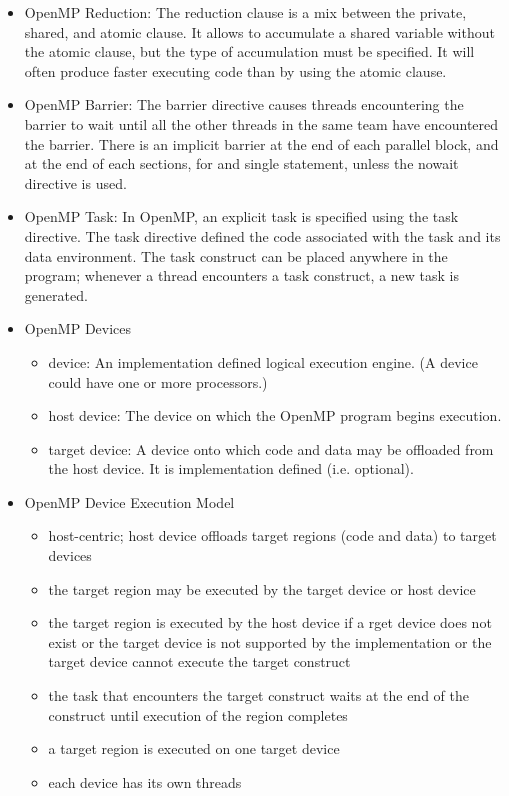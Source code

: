 \documentclass[paper=a4, fontsize=11pt]{scrartcl} %
\numberwithin{equation}{section} %
\numberwithin{figure}{section} %
\numberwithin{table}{section} %
\begin{document}
\begin{itemize}
  \item OpenMP Reduction: The reduction clause is a mix between the private, shared, and atomic clause. It allows to accumulate a shared variable without the atomic clause, but the type of accumulation must be specified. It will often produce faster executing code than by using the atomic clause.
  \item OpenMP Barrier: The barrier directive causes threads encountering the barrier to wait until all the other threads in the same team have encountered the barrier. There is an implicit barrier at the end of each parallel block, and at the end of each sections, for and single statement, unless the nowait directive is used.
  \item OpenMP Task: In OpenMP, an explicit task is specified using the task directive. The task directive defined the code associated with the task and its data environment. The task construct can be placed anywhere in the program; whenever a thread encounters a task construct, a new task is generated.
  \item OpenMP Devices
  \begin{itemize}
    \item device: An implementation defined logical execution engine. (A device could have one or more processors.)
    \item host device: The device on which the OpenMP program begins execution.
    \item target device: A device onto which code and data may be offloaded from the host device. It is implementation defined (i.e. optional).
  \end{itemize}
  \item OpenMP Device Execution Model
  \begin{itemize}
    \item host-centric; host device offloads target regions (code and data) to target devices
    \item the target region may be executed by the target device or host device
    \item the target region is executed by the host device if a rget device does not exist or the target device is not supported by the implementation or the target device cannot execute the target construct
    \item the task that encounters the target construct waits at the end of the construct until execution of the region completes
    \item a target region is executed on one target device
    \item each device has its own threads

\end{itemize}
\end{itemize}
\end{document}
